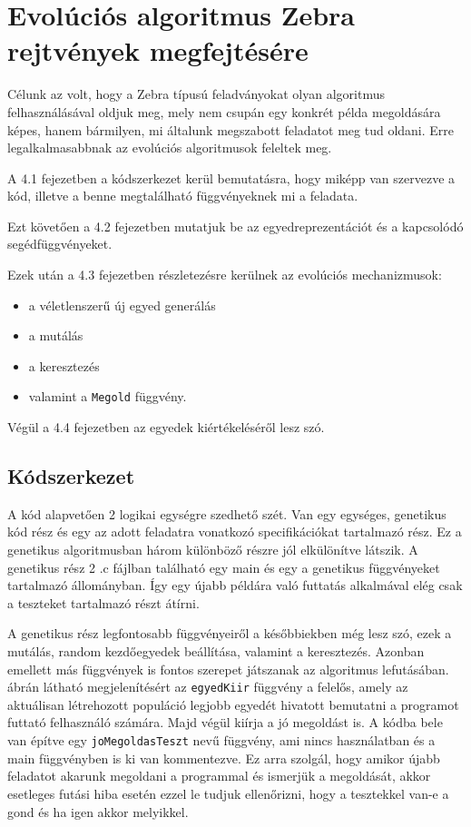 \documentclass[12ppt,a4paper,oneside]{report}
\begin{document}
\chapter{Evolúciós algoritmus Zebra rejtvények megfejtésére} %
	Célunk az volt, hogy a Zebra típusú feladványokat olyan algoritmus felhasználásával oldjuk meg, mely nem csupán egy konkrét példa megoldására képes, hanem bármilyen, mi általunk megszabott feladatot meg tud oldani.
    Erre legalkalmasabbnak az evolúciós algoritmusok feleltek meg.

	{A 4.1 fejezetben a kódszerkezet kerül bemutatásra, hogy miképp van szervezve a kód, illetve a benne megtalálható függvényeknek mi a feladata.}

	{Ezt követően a 4.2 fejezetben mutatjuk be az egyedreprezentációt és a kapcsolódó segédfüggvényeket.}

	{Ezek után a 4.3 fejezetben részletezésre kerülnek az evolúciós mechanizmusok:}

	\begin{itemize}
	\item a véletlenszerű új egyed generálás
	\item a mutálás
	\item a keresztezés
	\item  valamint a \texttt{Megold} függvény.
	\end{itemize}

	{Végül a 4.4 fejezetben az egyedek kiértékeléséről lesz szó.}


    \section{Kódszerkezet} %
			A kód alapvetően 2 logikai egységre szedhető szét.
            Van egy egységes, genetikus kód rész és egy az adott feladatra vonatkozó specifikációkat tartalmazó rész.
            Ez a genetikus algoritmusban három különböző részre jól elkülönítve látszik.
            A genetikus rész 2 .c fájlban található egy main és egy a genetikus függvényeket tartalmazó állományban.
            Így egy újabb példára való futtatás alkalmával elég csak a teszteket tartalmazó részt átírni.
            
			
			A genetikus rész legfontosabb függvényeiről a későbbiekben még lesz szó, ezek a mutálás, random kezdőegyedek beállítása, valamint a keresztezés.
            Azonban emellett más függvények is fontos szerepet játszanak az algoritmus lefutásában.
             ábrán látható megjelenítésért az \texttt{egyedKiir} függvény a felelős, amely az aktuálisan létrehozott populáció legjobb egyedét hivatott bemutatni a programot futtató felhasználó számára.
            Majd végül kiírja a jó megoldást is.
            A kódba bele van építve egy \texttt{joMegoldasTeszt} nevű függvény, ami nincs használatban és a main függvényben is ki van kommentezve.
            Ez arra szolgál, hogy amikor újabb feladatot akarunk megoldani a programmal és ismerjük a megoldását, akkor esetleges futási hiba esetén ezzel le tudjuk ellenőrizni, hogy a tesztekkel van-e a gond és ha igen akkor melyikkel.
			
\end{document}

